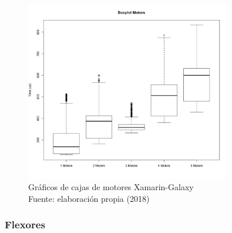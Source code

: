 \begin{figure}[H]
  \begin{center} 
   	\includegraphics[width=0.8\textwidth]{evaluation/graphics/Xamarin/Galaxy/BoxplotMotorsXamarinGalaxy.png} 
    \caption[Gráficos de cajas de motores Xamarin-Galaxy]{Gráficos de cajas de motores Xamarin-Galaxy\\Fuente: elaboración propia (2018)} 
    \label{fig:xamarin-galaxy-boxplot-motors}
  \end{center}
\end{figure}

\subsubsection{Flexores}



